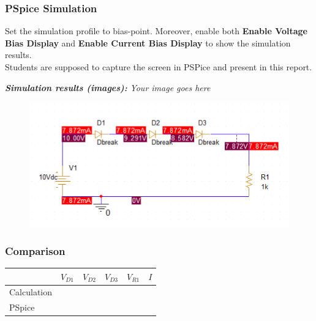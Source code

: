 \subsubsection{PSpice Simulation}
Set the simulation profile to bias-point. Moreover, enable both \textbf{Enable Voltage Bias Display} and \textbf{Enable Current Bias Display} to show the simulation results. \\

Students are supposed to capture the screen in PSPice and present in this report.

\textit{\textbf{Simulation results (images):}} \textit{Your image goes here}\\
\begin{figure}[!htp]
    \centering
    \includegraphics[width = 500px]{source/picture/bai_2/sim_ex2.png}
\end{figure}

\vspace{6cm}

\subsubsection{Comparison}

\begin{center}
    \begin{tabular}{l|l|l|l|l|l|}
        \cline{2-6}
                                          & \multicolumn{1}{c|}{$V_{D1}$} & \multicolumn{1}{c|}{$V_{D2}$} & \multicolumn{1}{c|}{$V_{D3}$} & \multicolumn{1}{c|}{$V_{R1}$} & \multicolumn{1}{c|}{$I$} \\ \hline
        \multicolumn{1}{|l|}{Calculation} &                               &                               &                               &                               &                          \\ \hline
        \multicolumn{1}{|l|}{PSpice}      &                               &                               &                               &                               &                          \\ \hline
    \end{tabular}
\end{center}

